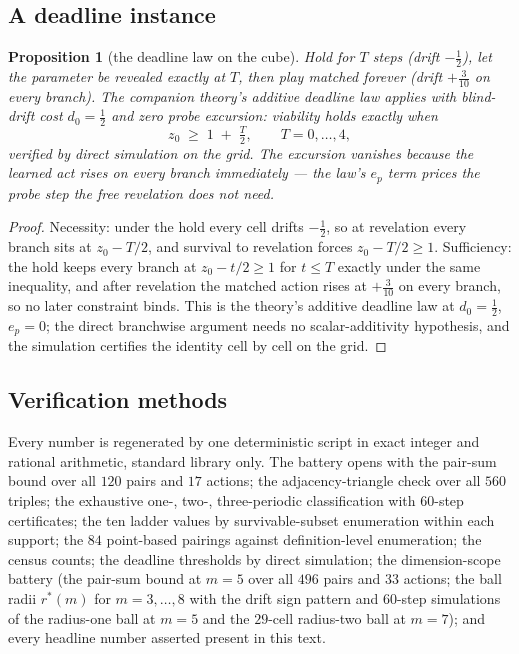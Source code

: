 \documentclass[10pt,twocolumn]{article}
\theoremstyle{plain}
\newtheorem{proposition}[theorem]{Proposition}
\theoremstyle{definition}
\theoremstyle{remark}
\begin{document}
\subsection{A deadline instance}\label{deadline}

\begin{proposition}[the deadline law on the cube]\label{prop:deadline}
Hold for \(T\) steps (drift \(-\tfrac12\)), let the parameter be
revealed exactly at \(T\), then play matched forever (drift
\(+\tfrac3{10}\) on every branch). The companion theory's additive
deadline law applies with blind-drift cost \(d_{0} = \tfrac12\) and
zero probe excursion: viability holds exactly when
\[
z_{0} \;\ge\; 1 \;+\; \tfrac{T}{2}, \qquad T = 0, \dots, 4,
\]
verified by direct simulation on the grid. The excursion vanishes
because the learned act rises on every branch immediately --- the
law's \(e_{p}\) term prices the probe step the free revelation does
not need.
\end{proposition}

\begin{proof}
Necessity: under the hold every cell drifts \(-\tfrac12\), so at
revelation every branch sits at \(z_{0} - T/2\), and survival to
revelation forces \(z_{0} - T/2 \ge 1\). Sufficiency: the hold keeps
every branch at \(z_{0} - t/2 \ge 1\) for \(t \le T\) exactly
under the same inequality, and after revelation the matched action
rises at \(+\tfrac3{10}\) on every branch, so no later constraint
binds. This is the theory's additive deadline law at
\(d_{0} = \tfrac12\), \(e_{p} = 0\); the direct branchwise argument
needs no scalar-additivity hypothesis, and the simulation certifies
the identity cell by cell on the grid.
\end{proof}

\subsection{Verification methods}\label{methods}

Every number is regenerated by one deterministic script in exact integer and rational arithmetic, standard library only. The battery opens with the pair-sum bound over all \(120\) pairs and \(17\) actions; the
adjacency-triangle check over all \(560\) triples; the exhaustive
one-, two-, three-periodic classification with \(60\)-step
certificates; the ten ladder values by survivable-subset enumeration
within each support; the \(84\) point-based pairings against
definition-level enumeration; the census counts; the deadline
thresholds by direct simulation; the dimension-scope battery (the
pair-sum bound at \(m = 5\) over all \(496\) pairs and \(33\)
actions; the ball radii \(r^{*}(m)\) for \(m = 3, \dots, 8\) with
the drift sign pattern and \(60\)-step simulations of the radius-one
ball at \(m = 5\) and the \(29\)-cell radius-two ball at
\(m = 7\)); and every headline number asserted present in this
text.
\end{document}
